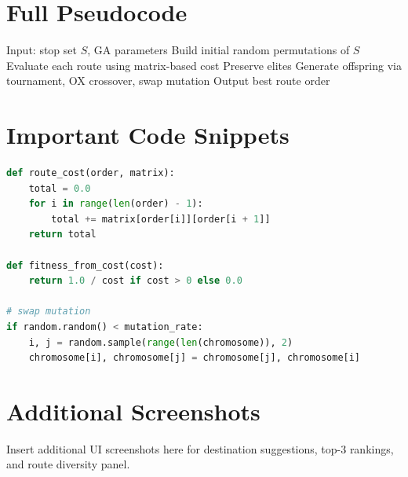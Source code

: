 \documentclass[12pt,a4paper]{report}
\begin{document}



\appendix
\chapter{Full Pseudocode}
\begin{algorithm}[H]
\caption{Extended GA Procedure}
\begin{algorithmic}[1]
\State Input: stop set $S$, GA parameters
\State Build initial random permutations of $S$
\Repeat
  \State Evaluate each route using matrix-based cost
  \State Preserve elites
  \State Generate offspring via tournament, OX crossover, swap mutation
\State Output best route order
\end{algorithmic}
\end{algorithm}

\chapter{Important Code Snippets}
\begin{lstlisting}[language=Python,caption={Simplified fitness and mutation snippet}]
def route_cost(order, matrix):
    total = 0.0
    for i in range(len(order) - 1):
        total += matrix[order[i]][order[i + 1]]
    return total

def fitness_from_cost(cost):
    return 1.0 / cost if cost > 0 else 0.0

# swap mutation
if random.random() < mutation_rate:
    i, j = random.sample(range(len(chromosome)), 2)
    chromosome[i], chromosome[j] = chromosome[j], chromosome[i]
\end{lstlisting}

\chapter{Additional Screenshots}
Insert additional UI screenshots here for destination suggestions, top-3 rankings, and route diversity panel.
\end{document}
